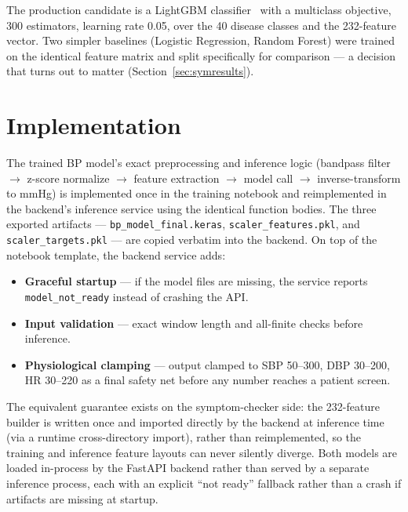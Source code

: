\documentclass[12pt,a4paper]{report}
\begin{document}
The production candidate is a LightGBM classifier~\cite{lightgbm} with a
multiclass objective, 300 estimators, learning rate 0.05, over the 40 disease
classes and the 232-feature vector. Two simpler baselines (Logistic Regression,
Random Forest) were trained on the identical feature matrix and split
specifically for comparison --- a decision that turns out to matter
(Section~\ref{sec:symresults}).

\section{Implementation}

The trained BP model's exact preprocessing and inference logic (bandpass filter
$\rightarrow$ z-score normalize $\rightarrow$ feature extraction $\rightarrow$
model call $\rightarrow$ inverse-transform to mmHg) is implemented once in the
training notebook and reimplemented in the backend's inference service using the
identical function bodies. The three exported artifacts ---
\texttt{bp\_model\_final.keras}, \texttt{scaler\_features.pkl}, and
\texttt{scaler\_targets.pkl} --- are copied verbatim into the backend. On top of
the notebook template, the backend service adds:

\begin{itemize}[leftmargin=1.4em]
  \item \textbf{Graceful startup} --- if the model files are missing, the
  service reports \texttt{model\_not\_ready} instead of crashing the API.
  \item \textbf{Input validation} --- exact window length and all-finite checks
  before inference.
  \item \textbf{Physiological clamping} --- output clamped to SBP 50--300, DBP
  30--200, HR 30--220 as a final safety net before any number reaches a patient
  screen.
\end{itemize}

The equivalent guarantee exists on the symptom-checker side: the 232-feature
builder is written once and imported directly by the backend at inference time
(via a runtime cross-directory import), rather than reimplemented, so the
training and inference feature layouts can never silently diverge. Both models
are loaded in-process by the FastAPI backend rather than served by a separate
inference process, each with an explicit ``not ready'' fallback rather than a
crash if artifacts are missing at startup.


\end{document}

